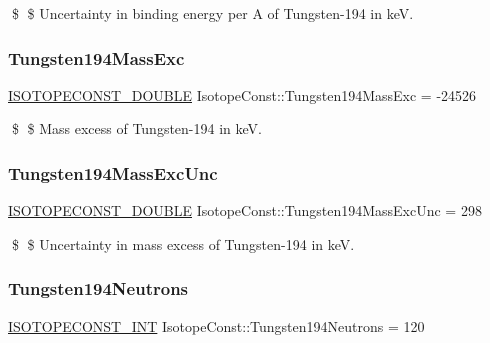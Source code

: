 \$ \$ Uncertainty in binding energy per A of Tungsten-\/194 in keV. \mbox{\label{group___isotope_const-_tungsten-_w194_ga9b685815e42d31c648b2c8e4dd9f6990}} 
\subsubsection{\texorpdfstring{Tungsten194\+Mass\+Exc}{Tungsten194MassExc}}
{\footnotesize\ttfamily \mbox{\hyperlink{group___isotope_const-_macros_ga8f45a7272ce02c0b4c65c44636ed719a}{I\+S\+O\+T\+O\+P\+E\+C\+O\+N\+S\+T\+\_\+\+D\+O\+U\+B\+LE}} Isotope\+Const\+::\+Tungsten194\+Mass\+Exc = -\/24526}

\$ \$ Mass excess of Tungsten-\/194 in keV. \mbox{\label{group___isotope_const-_tungsten-_w194_gab41c4922be8aee0dac1d76cd4853aef0}} 
\subsubsection{\texorpdfstring{Tungsten194\+Mass\+Exc\+Unc}{Tungsten194MassExcUnc}}
{\footnotesize\ttfamily \mbox{\hyperlink{group___isotope_const-_macros_ga8f45a7272ce02c0b4c65c44636ed719a}{I\+S\+O\+T\+O\+P\+E\+C\+O\+N\+S\+T\+\_\+\+D\+O\+U\+B\+LE}} Isotope\+Const\+::\+Tungsten194\+Mass\+Exc\+Unc = 298}

\$ \$ Uncertainty in mass excess of Tungsten-\/194 in keV. \mbox{\label{group___isotope_const-_tungsten-_w194_gaf5bf5f4566d4e9a94a6dd93e9bc4280b}} 
\subsubsection{\texorpdfstring{Tungsten194\+Neutrons}{Tungsten194Neutrons}}
{\footnotesize\ttfamily \mbox{\hyperlink{group___isotope_const-_macros_ga5f18360b3e99483a35c32d789e62621c}{I\+S\+O\+T\+O\+P\+E\+C\+O\+N\+S\+T\+\_\+\+I\+NT}} Isotope\+Const\+::\+Tungsten194\+Neutrons = 120}

